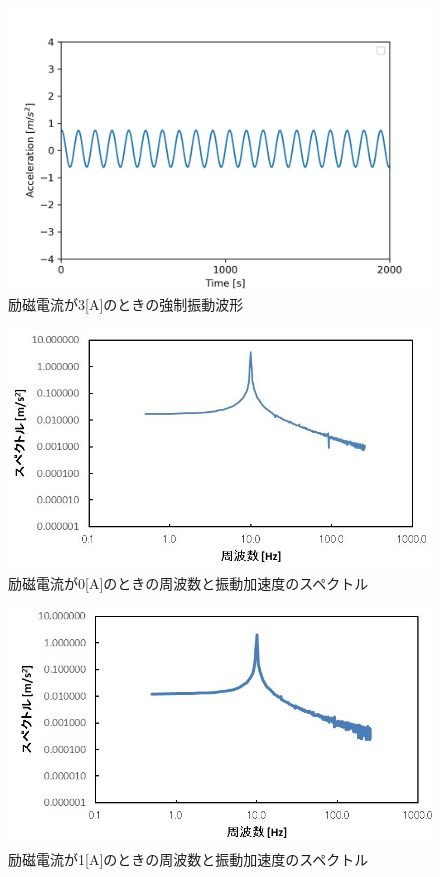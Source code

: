 \documentclass[a4paper,10.5pt]{jsarticle}
\begin{document}
\begin{figure}[h]
  \centering
  \includegraphics[width=14cm]{vib4.png}
  \caption{励磁電流が3[A]のときの強制振動波形}
\end{figure}
\newpage
\begin{figure}[h]
  \centering
  \includegraphics[width=14cm]{7.png}
  \caption{励磁電流が0[A]のときの周波数と振動加速度のスペクトル}
\end{figure}
\begin{figure}[h]
  \centering
  \includegraphics[width=14cm]{8.png}
  \caption{励磁電流が1[A]のときの周波数と振動加速度のスペクトル}
\end{figure}
\end{document}
